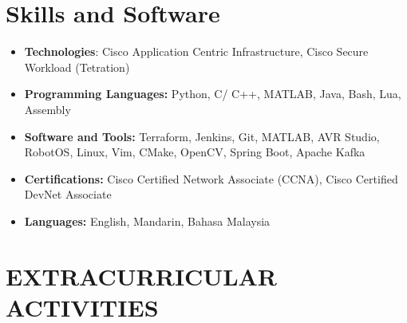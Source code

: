 \documentclass[14pt,a4paper]{moderncv}
\makeatletter
\newcommand*{\customcvproject}[4][.25em]{
  \begin{tabular}{@{}l} 
    {\bfseries #2}
  \end{tabular}
  \hfill%
  \begin{tabular}{l@{}}
     {\itshape #3}
  \end{tabular}
  \ifx&#4&%
  \else{\\%
    \begin{minipage}{\maincolumnwidth}%
      \small#4%
    \end{minipage}}\fi%
  \par\addvspace{#1}}
\makeatother
\begin{document}



\section{Skills and Software \faTasks}

\begin{minipage}{\maincolumnwidth}
    \begin{itemize}
        \item \textbf{Technologies}: Cisco Application Centric Infrastructure, Cisco Secure Workload (Tetration)
        \item \textbf{Programming Languages:} Python, C/ C++, MATLAB, Java, Bash, Lua, Assembly
        \item \textbf{Software and Tools:} Terraform, Jenkins, Git, MATLAB, AVR Studio, RobotOS, Linux, Vim, CMake, OpenCV, Spring Boot, Apache Kafka
        \item \textbf{Certifications:} Cisco Certified Network Associate (CCNA), Cisco Certified DevNet Associate
        \item \textbf{Languages:} English, Mandarin, Bahasa Malaysia
    \end{itemize}
\end{minipage}
\vspace*{2mm}

\section{EXTRACURRICULAR ACTIVITIES \faChartLine}
\end{document}
